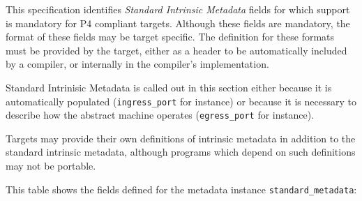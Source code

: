 \documentclass[12pt]{article}
\begin{document}
This specification identifies \textit{Standard Intrinsic Metadata} fields for which 
support is mandatory for P4 compliant targets. Although these fields are mandatory, 
the format of these fields may be target specific. The definition for these 
formats must be provided by the target, either as a header to be automatically 
included by a compiler, or internally in the compiler's implementation.

Standard Intrinisic Metadata is called out in this section either because 
it is automatically populated (\texttt{ingress_port} for instance) or because it 
is necessary to describe how the abstract machine operates (\texttt{egress_port} for 
instance).

Targets may provide their own definitions of intrinsic metadata in addition to the standard
intrinsic metadata, although programs which depend on such definitions may not be portable.

This table shows the fields defined for the metadata instance \texttt{standard_metadata}:
\end{document}
